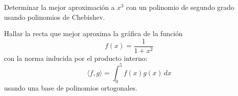 \documentclass[11pt]{article}
\begin{document}

\begin{question} %
Determinar la mejor aproximación a $x^3$ con un polinomio de segundo grado usando polinomios de Chebishev.
\end{question}


\begin{question} %
Hallar la recta que mejor aproxima la gráfica de la función 
\[ f(x) = \frac{1}{1 + x^2} \]
con la norma inducida por el producto interno:
\[ \langle f, g \rangle = \int_0^5 f(x) g(x) \, dx \] 
usando una base de polinomios ortogonales.
\end{question}
\end{document}

